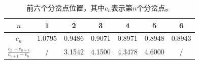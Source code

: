 \documentclass[12pt,a4paper]{article}
\begin{document}
\begin{table}[t]
    \centering
    \caption{前六个分岔点位置，其中$c_n$表示第$n$个分岔点。}
    \label{tab:ex8_forks}
    \begin{tabular}{c|cccccc}
        \toprule
        \(n\) & 1 & 2 & 3 & 4 & 5 & 6\tabularnewline
        \midrule
        \(c_n\) & 1.0795 & 0.9486 & 0.9071 & 0.8971 & 0.8948 &
        0.8943\tabularnewline
        \(\frac{c_n-c_{n-1}}{c_{n+1}-c_n}\) & / & 3.1542 & 4.1500 & 4.3478 &
        4.6000 & /\tabularnewline
        \bottomrule
    \end{tabular}
\end{table}

\begin{figure}[t]
    \centering
\end{figure}
\end{document}
